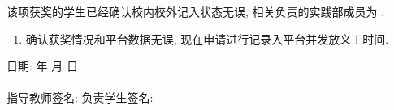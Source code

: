 \documentclass{article}
\begin{document}
该项获奖的学生已经确认校内校外记入状态无误, 相关负责的实践部成员为 \underline{\hspace{4em}}.

\begin{enumerate}[label=$\square$]
  \item 确认获奖情况和平台数据无误, 现在申请进行记录入平台并发放义工时间.
\end{enumerate}

\begin{flushright}
  日期: \underline{\hspace{4em}} 年 \underline{\hspace{2em}} 月 \underline{\hspace{2em}} 日
  ~\\~\\
  指导教师签名: \underline{\hspace{6em}} \hspace{1em}
  负责学生签名: \underline{\hspace{6em}}
\end{flushright}
\end{document}
